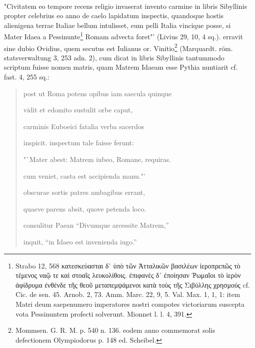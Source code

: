 \documentclass[a4paper, 11pt, oneside, polutonikogreek, german, twocolumn]{article}
\begin{document}
\paragraph{}
"Civitatem eo tempore recens religio invaserat invento carmine in libris Sibyllinis propter celebrius eo anno de caelo lapidatum inspectis, quandoque hostis alienigena terrae Italiae bellum intulisset, eum pelli Italia vincique posse, si Mater Idaea a Pessinunte\footnote{Strabo 12, 568 κατεσκεύασται δ᾽ ὑπὸ τῶν Ἀτταλικῶν βασιλέων ἱεροπρεπῶς τὸ τέμενος ναῷ τε καὶ στοαῖς λευκολίθοις. ἐπιφανὲς δ᾽ ἐποίησαν Ῥωμαῖοι τὸ ἱερὸν ἀφίδρυμα ἐνθένδε τῆς θεοῦ μεταπεμψάμενοι κατὰ τοὺς τῆς Σιβύλλης χρησμούς cf. Cic. de sen. 45. Arnob. 2, 73. Amm. Marc. 22, 9, 5. Val. Max. 1, 1, 1: item Matri deum saepenumero imperatores nostri compotes victoriarum suscepta vota Pessinuntem profecti solverunt. Mionnet l. l. 4, 391.} Romam advecta foret"' (Livius 29, 10, 4 sq.). erravit sine dubio Ovidius, quem secutus est Iulianus or. Vinitio\footnote{Mommsen. G. R. M. p. 540 n. 136. eodem anno commemorat solis defectionem Olympiodorus p. 148 ed. Scheibel.} (Marquardt. röm. statsverwaltung 3, 253 adn. 2), cum dicat in libris Sibyllinis tantummodo scriptum fuisse nomen matris, quam Matrem Idaeam esse Pythia nuntiarit cf. fast. 4, 255 sq.:
\begin{quotation}
post ut Roma potens opibus iam saecula quinque

vidit et edomito sustulit orbe caput,

carminis Euboeici fatalia verba sacerdos

inspicit. inspectum tale faisse ferunt:

"`Mater abest: Matrem iubeo, Romane, requiras.

cum veniet, casta est accipienda manu."'

obscurae sortis patres ambagibus errant,

quaeve parens absit, quove petenda loco.

consulitur Paean "`Divumque arcessite Matrem,"'

inquit, "`in Idaeo est invenienda iugo."'
\end{quotation}
\end{document}
